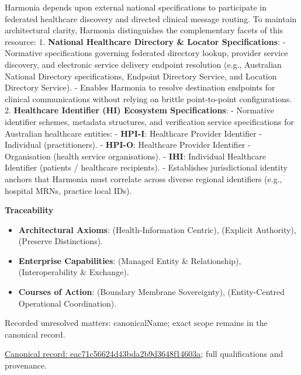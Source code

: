 Harmonia depends upon external national specifications to participate in federated healthcare discovery and directed clinical message routing. To maintain architectural clarity, Harmonia distinguishes the complementary facets of this resource:
1. \textbf{National Healthcare Directory \& Locator Specifications}:
   - Normative specifications governing federated directory lookup, provider service discovery, and electronic service delivery endpoint resolution (e.g., Australian National Directory specifications, Endpoint Directory Service, and Location Directory Service).
   - Enables Harmonia to resolve destination endpoints for clinical communications without relying on brittle point-to-point configurations.
2. \textbf{Healthcare Identifier (HI) Ecosystem Specifications}:
   - Normative identifier schemes, metadata structures, and verification service specifications for Australian healthcare entities:
     - \textbf{HPI-I}: Healthcare Provider Identifier - Individual (practitioners).
     - \textbf{HPI-O}: Healthcare Provider Identifier - Organisation (health service organisations).
     - \textbf{IHI}: Individual Healthcare Identifier (patients / healthcare recipients).
   - Establishes jurisdictional identity anchors that Harmonia must correlate across diverse regional identifiers (e.g., hospital MRNs, practice local IDs).



\par\medskip\textbf{Traceability}\par


\begin{itemize}


\item \textbf{Architectural Axioms}: \texttt{} (Health-Information Centric), \texttt{} (Explicit Authority), \texttt{} (Preserve Distinctions).

\item \textbf{Enterprise Capabilities}: \texttt{} (Managed Entity \& Relationship), \texttt{} (Interoperability \& Exchange).

\item \textbf{Courses of Action}: \texttt{} (Boundary Membrane Sovereignty), \texttt{} (Entity-Centred Operational Coordination).

\end{itemize}

{\small Recorded unresolved matters: canonicalName; exact scope remains in the canonical record.}\par
{\footnotesize \href{../../../../../../../continuum/strategy/resource/eac71c56624d43bda2b9d3648f14603a.md}{Canonical record: eac71c56624d43bda2b9d3648f14603a}; full qualifications and provenance.}\par
